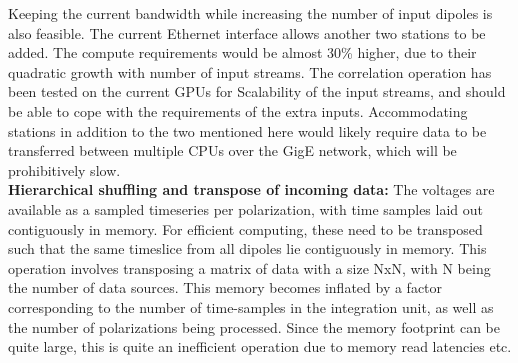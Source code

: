 \documentclass{ws-jai}
\begin{document}
Keeping the  current bandwidth while increasing  the number of input  dipoles is
also feasible. The current Ethernet interface  allows another two stations to be
added.   The compute  requirements would  be almost  30\% higher,  due to  their
quadratic growth  with number of  input streams.  The correlation  operation has
been tested on the current GPUs for Scalability of the input streams, and should
be  able to  cope  with the  requirements of  the  extra inputs.   Accommodating
stations in addition to  the two mentioned here would likely  require data to be
transferred  between  multiple  CPUs  over  the  GigE  network,  which  will  be
prohibitively slow.\\


\noindent \textbf {Hierarchical  shuffling and transpose of  incoming data:} The
voltages  are available  as a  sampled  timeseries per  polarization, with  time
samples laid out contiguously in memory.  For efficient computing, these need to
be transposed such that the same  timeslice from all dipoles lie contiguously in
memory. This  operation involves transposing a  matrix of data with  a size NxN,
with N  being the  number of data  sources.  This memory  becomes inflated  by a
factor corresponding to  the number of time-samples in the  integration unit, as
well as the number of polarizations  being processed. Since the memory footprint
can be quite  large, this is quite  an inefficient operation due  to memory read
latencies etc.\\
\end{document}
